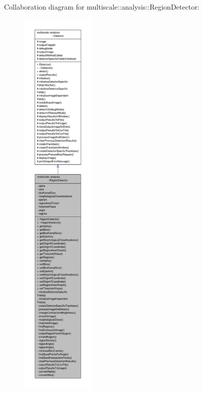 Collaboration diagram for multiscale\-:\-:analysis\-:\-:Region\-Detector\-:\nopagebreak
\begin{figure}[H]
\begin{center}
\leavevmode
\includegraphics[height=550pt]{classmultiscale_1_1analysis_1_1RegionDetector__coll__graph}
\end{center}
\end{figure}
